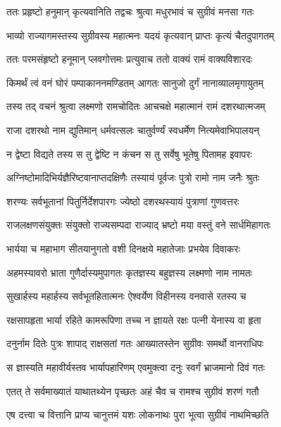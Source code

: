 
\twolineshloka
{ततः प्रहृष्टो हनुमान् कृत्यवानिति तद्वचः}
{श्रुत्वा मधुरभावं च सुग्रीवं मनसा गतः} %

\twolineshloka
{भाव्यो राज्यागमस्तस्य सुग्रीवस्य महात्मनः}
{यदयं कृत्यवान् प्राप्तः कृत्यं चैतदुपागतम्} %

\twolineshloka
{ततः परमसंहृष्टो हनूमान् प्लवगोत्तमः}
{प्रत्युवाच ततो वाक्यं रामं वाक्यविशारदः} %

\twolineshloka
{किमर्थं त्वं वनं घोरं पम्पाकाननमण्डितम्}
{आगतः सानुजो दुर्गं नानाव्यालमृगायुतम्} %

\twolineshloka
{तस्य तद् वचनं श्रुत्वा लक्ष्मणो रामचोदितः}
{आचचक्षे महात्मानं रामं दशरथात्मजम्} %

\twolineshloka
{राजा दशरथो नाम द्युतिमान् धर्मवत्सलः}
{चातुर्वर्ण्यं स्वधर्मेण नित्यमेवाभिपालयन्} %

\twolineshloka
{न द्वेष्टा विद्यते तस्य स तु द्वेष्टि न कंचन}
{स तु सर्वेषु भूतेषु पितामह इवापरः} %

\twolineshloka
{अग्निष्टोमादिभिर्यज्ञैरिष्टवानाप्तदक्षिणैः}
{तस्यायं पूर्वजः पुत्रो रामो नाम जनैः श्रुतः} %

\twolineshloka
{शरण्यः सर्वभूतानां पितुर्निर्देशपारगः}
{ज्येष्ठो दशरथस्यायं पुत्राणां गुणवत्तरः} %

\twolineshloka
{राजलक्षणसंयुक्तः संयुक्तो राज्यसम्पदा}
{राज्याद् भ्रष्टो मया वस्तुं वने सार्धमिहागतः} %

\twolineshloka
{भार्यया च महाभाग सीतयानुगतो वशी}
{दिनक्षये महातेजाः प्रभयेव दिवाकरः} %

\twolineshloka
{अहमस्यावरो भ्राता गुणैर्दास्यमुपागतः}
{कृतज्ञस्य बहुज्ञस्य लक्ष्मणो नाम नामतः} %

\twolineshloka
{सुखार्हस्य महार्हस्य सर्वभूतहितात्मनः}
{ऐश्वर्येण विहीनस्य वनवासे रतस्य च} %

\twolineshloka
{रक्षसापहृता भार्या रहिते कामरूपिणा}
{तच्च न ज्ञायते रक्षः पत्नी येनास्य वा हृता} %

\twolineshloka
{दनुर्नाम दितेः पुत्रः शापाद् राक्षसतां गतः}
{आख्यातस्तेन सुग्रीवः समर्थो वानराधिपः} %

\twolineshloka
{स ज्ञास्यति महावीर्यस्तव भार्यापहारिणम्}
{एवमुक्त्वा दनुः स्वर्गं भ्राजमानो दिवं गतः} %

\twolineshloka
{एतत् ते सर्वमाख्यातं याथातथ्येन पृच्छतः}
{अहं चैव च रामश्च सुग्रीवं शरणं गतौ} %

\twolineshloka
{एष दत्त्वा च वित्तानि प्राप्य चानुत्तमं यशः}
{लोकनाथः पुरा भूत्वा सुग्रीवं नाथमिच्छति} %

